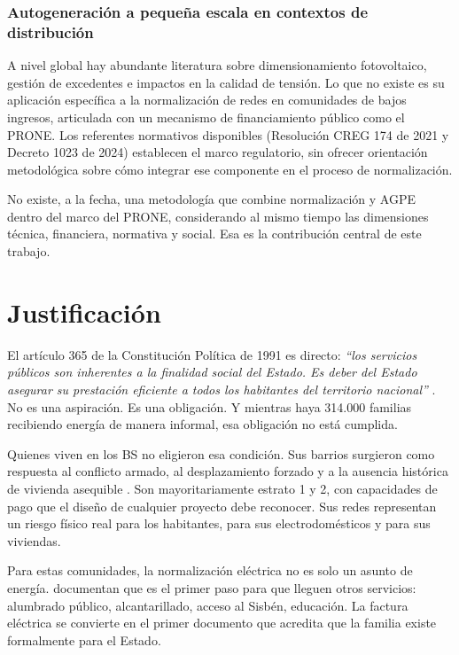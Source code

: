 \subsubsection{Autogeneración a pequeña escala en contextos de distribución}

A nivel global hay abundante literatura sobre dimensionamiento fotovoltaico, gestión de excedentes e impactos en la calidad de tensión. Lo que no existe es su aplicación específica a la normalización de redes en comunidades de bajos ingresos, articulada con un mecanismo de financiamiento público como el PRONE. Los referentes normativos disponibles (Resolución CREG 174 de 2021 y Decreto 1023 de 2024) establecen el marco regulatorio, sin ofrecer orientación metodológica sobre cómo integrar ese componente en el proceso de normalización.

No existe, a la fecha, una metodología que combine normalización y AGPE dentro del marco del PRONE, considerando al mismo tiempo las dimensiones técnica, financiera, normativa y social. Esa es la contribución central de este trabajo.


\section{Justificación}
\label{sec:justificacion}

El artículo 365 de la Constitución Política de 1991 es directo: \textit{``los servicios públicos son inherentes a la finalidad social del Estado. Es deber del Estado asegurar su prestación eficiente a todos los habitantes del territorio nacional''} \parencite{ConstitucionPolitica1991}. No es una aspiración. Es una obligación. Y mientras haya 314.000 familias recibiendo energía de manera informal, esa obligación no está cumplida.

Quienes viven en los BS no eligieron esa condición. Sus barrios surgieron como respuesta al conflicto armado, al desplazamiento forzado y a la ausencia histórica de vivienda asequible \parencite{UribeCastro2011}. Son mayoritariamente estrato 1 y 2, con capacidades de pago que el diseño de cualquier proyecto debe reconocer. Sus redes representan un riesgo físico real para los habitantes, para sus electrodomésticos y para sus viviendas.

Para estas comunidades, la normalización eléctrica no es solo un asunto de energía. \textcite{MosqueraNoguera2005} documentan que es el primer paso para que lleguen otros servicios: alumbrado público, alcantarillado, acceso al Sisbén, educación. La factura eléctrica se convierte en el primer documento que acredita que la familia existe formalmente para el Estado.

